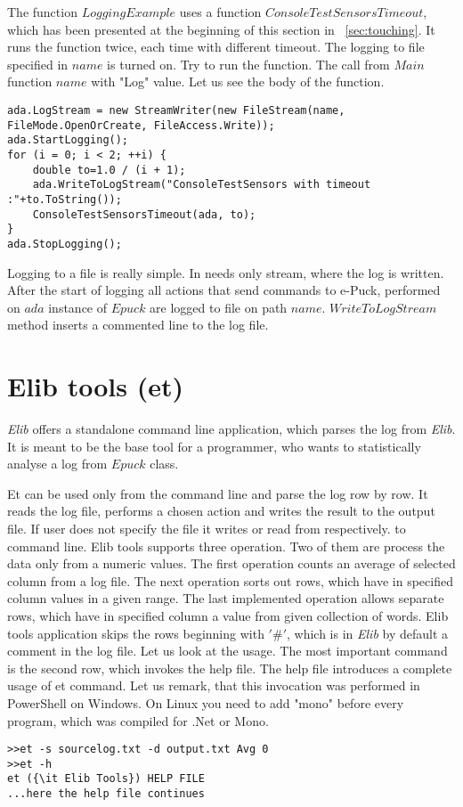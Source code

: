 	The function $LoggingExample$ uses a function $ConsoleTestSensorsTimeout$, which has been presented at the beginning of this section in ~\ref{sec:touching}.
	It runs the function twice, each time with different timeout. The logging to file specified in $name$ is turned on.
	Try to run the function. The call from $Main$ function $name$ with "Log" value.
	Let us see the body of the function.
\begin{lstlisting}
ada.LogStream = new StreamWriter(new FileStream(name, FileMode.OpenOrCreate, FileAccess.Write));
ada.StartLogging();
for (i = 0; i < 2; ++i) {
	double to=1.0 / (i + 1);
	ada.WriteToLogStream("ConsoleTestSensors with timeout :"+to.ToString());
	ConsoleTestSensorsTimeout(ada, to);
}
ada.StopLogging();
\end{lstlisting}
	Logging to a file is really simple. In needs only stream, where the log is written. 
	After the start of logging all actions that send commands to e-Puck, performed on $ada$ instance of $Epuck$ are logged
	to file on path $name$.
	$WriteToLogStream$ method inserts a commented line to the log file.

\section{Elib tools (et)}\label{sec:et}
	{\it Elib} offers a standalone command line application, which
	parses the log from {\it Elib}. It is meant to be the base tool for a programmer,
	who wants to statistically analyse a log from $Epuck$ class.

	Et can be used only from the command line and parse the log row by row.
	It reads the log file, performs a chosen action and writes the result to the output file.
	If user does not specify the file it writes or read from respectively. to command line.
	Elib tools supports three operation. Two of them are process the data only from a numeric values.
	The first operation counts an average of selected column from a log file.
	The next operation sorts out rows, which have in specified column values in a given range.
	The last implemented operation allows separate rows, 
	which have in specified column a value from given collection of words.
	Elib tools application skips the rows beginning with $'\#'$, 
	which is in {\it Elib} by default a comment in the log file.
	Let us look at the usage. The most important command is the second row, which invokes the help file.
	The help file introduces a complete usage of et command.
	Let us remark, that this invocation was performed in PowerShell on Windows. On Linux you need to add "mono" before every program,
	which was compiled for .Net or Mono.
\begin{verbatim}
>>et -s sourcelog.txt -d output.txt Avg 0
>>et -h
et ({\it Elib Tools}) HELP FILE
...here the help file continues
\end{verbatim}

